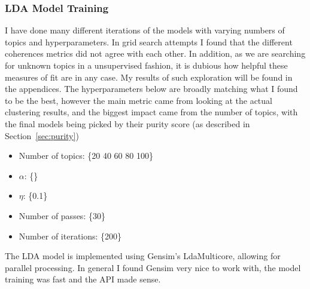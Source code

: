 \documentclass[12pt]{article}
\begin{document}
\subsubsection*{LDA Model Training}


I have done many different iterations of the models with varying numbers of topics and
hyperparameters. In grid search attempts I found that the different coherences metrics did not agree
with each other. In addition, as we are searching for unknown topics in a unsupervised fashion, it is
dubious how helpful these measures of fit are in any case. My results of such exploration will be
found in the appendices. The hyperparameters below are broadly matching what I found to be the best,
however the main metric came from looking at the actual clustering results, and the biggest impact
came from the number of topics, with the final models being picked by their purity score (as
described in Section~\ref{sec:purity})

\begin{itemize}

	\item Number of topics: \{20 40 60 80 100\}

	\item $\alpha$: \{\}

	\item $\eta$: \{0.1\}

	\item Number of passes: \{30\}

	\item Number of iterations: \{200\}

\end{itemize}

The LDA model is implemented using Gensim's LdaMulticore\cite{gensim}, allowing for parallel
processing. In general I found Gensim very nice to work with, the model training was fast and the
API made sense.




\end{document}
